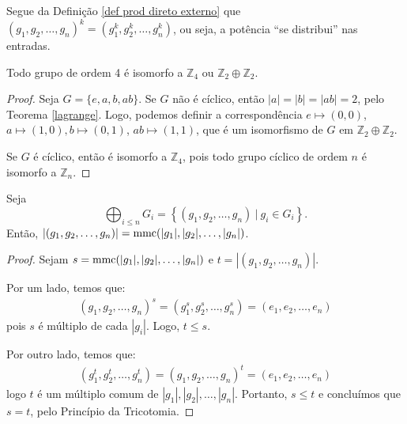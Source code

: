 	\begin{remark}
		Segue da Definição \ref{def prod direto externo} que 
		$(g_1, g_2, \dots, g_n)^k = (g_1^k, g_2^k, \dots, g_n^k)$, ou seja, 
		a potência ``se distribui'' nas entradas.
	\end{remark}
	\begin{theorem}
		Todo grupo de ordem 4 é isomorfo a $\mathbb{Z}_4$ 
		ou $\mathbb{Z}_2\oplus\mathbb{Z}_2$.
	\end{theorem}
	\begin{proof}
		Seja $G = \{e, a, b, ab\}$. Se $G$ não é cíclico, então 
		$|a| = |b| = |ab| = 2$, pelo Teorema \ref{lagrange}. 
		Logo, podemos definir a correspondência 
		$e\mapsto (0,0)$, $a\mapsto (1,0), b\mapsto (0,1)$, $ab\mapsto (1,1)$, que é um
		isomorfismo de $G$ em $\mathbb{Z}_2\oplus\mathbb{Z}_2$.
		\par\vspace{0.3cm} Se $G$ é cíclico, então é isomorfo a
		$\mathbb{Z}_4$, pois todo grupo cíclico de ordem $n$ é isomorfo 
		a $\mathbb{Z}_n$. 
	\end{proof}
	\begin{theorem}
	\label{ordem}
		Seja 
		\begin{equation*}
		\bigoplus_{i \leq n} G_i = \left\{(g_1, g_2, \dots , g_n) \ | \ g_i\in G_i \right\}. 
		\end{equation*}
		Então,
		$|(g_1, g_2, \dots , g_n)| = \operatorname{mmc}(|g_1|, |g_2|, \dots , |g_n|)$.
	\end{theorem}
	\begin{proof}
		Sejam $s = \operatorname{mmc}(|g_1|, |g_2|, \dots, |g_n|)$ e 
		$t = |(g_1, g_2, \dots , g_n)|$.
		\par\vspace{0.3cm} Por um lado, temos que:
		\begin{align*}
		    (g_1, g_2, \dots , g_n)^s 
		    = (g_1^s, g_2^s, \dots , g_n^s) 
		    = (e_1, e_2, \dots , e_n)
		\end{align*}
		pois $s$ é múltiplo de cada $|g_i|$. Logo, $t\leq s$.
		\par\vspace{0.3cm} Por outro lado, temos que:
		\begin{align*}
		    (g_1^t, g_2^t, \dots , g_n^t) 
		    = (g_1, g_2, \dots , g_n)^t 
		    = (e_1, e_2, \dots , e_n)
		\end{align*}
		logo $t$ é um múltiplo comum de $|g_1|, |g_2|, \dots , |g_n|$.
		Portanto, $s\leq t$ e concluímos que $s = t$, pelo 
		Princípio da Tricotomia. 
	\end{proof}
